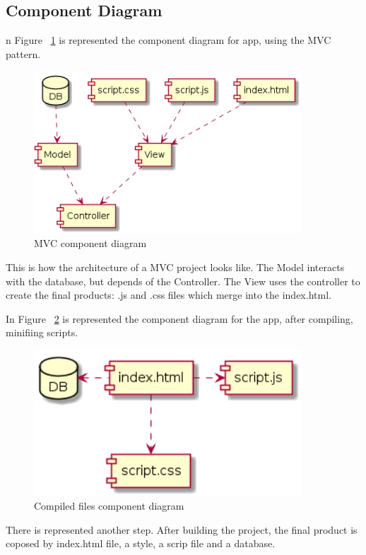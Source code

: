 \documentclass[12pt,a4paper,titlepage]{article}
\begin{document}
\subsection{Component Diagram}
n Figure ~\ref{fig:8intermediar} is represented the component diagram for app, using the MVC pattern.
\begin{figure}[H]
\centering
	\includegraphics[width=10cm]{8intermediar}
	\caption{MVC component diagram}
	\label{fig:8intermediar}
\end{figure}
This is how the architecture of a MVC project looks like. The Model interacts with the database, but depends of the Controller. The View uses the controller to create the final products: .js and .css files which merge into the index.html.

In Figure ~\ref{fig:8final} is represented the component diagram for the app, after compiling, minifiing scripts.
\begin{figure}[H]
\centering
	\includegraphics[width=10cm]{8final}
	\caption{Compiled files component diagram}
	\label{fig:8final}
\end{figure}
There is represented another step. After building the project, the final product is coposed by index.html file, a style, a scrip file and a database.
\end{document}
